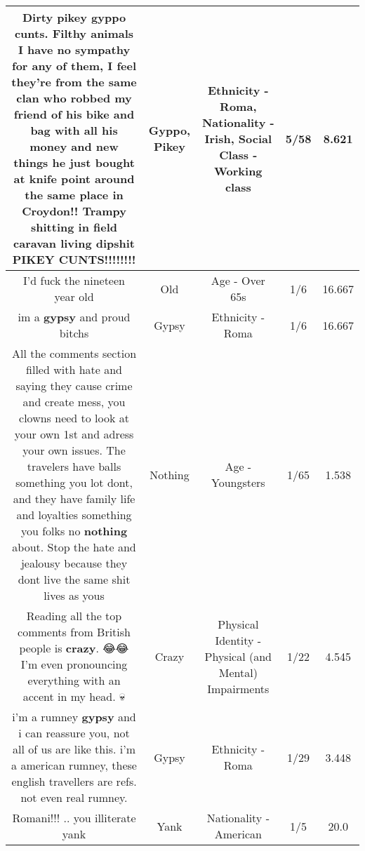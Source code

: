 \documentclass[11pt]{article}
\newlength\mylength
\begin{document}
\begin{center}
\begin{longtable}{|C{.65\mylength}|C{.30\mylength}|C{.12\mylength}|C{.12\mylength}|C{.12\mylength}|}
  \small Dirty \textbf{p\textbf{ikey}} \textbf{gyppo} cunts. Filthy animals I have no sympathy for any of them, I feel they're from the same clan who robbed my friend of his bike and bag with all his money and new things he just bought at knife point around the same place in Croydon!! Trampy shitting in field caravan living dipshit \textbf{P\textbf{IKEY}} CUNTS!!!!!!!!\normalsize   & Gyppo, Pikey & Ethnicity - Roma, Nationality - Irish, Social Class - Working class & 5/58 & 8.621 \\  \hline
  \small I'd fuck the nineteen year old\normalsize   & Old & Age - Over 65s & 1/6 & 16.667 \\  \hline
  \small im a \textbf{gypsy} and proud bitchs\normalsize   & Gypsy & Ethnicity - Roma & 1/6 & 16.667 \\  \hline
  \small All the comments section filled with hate and saying they cause crime and create mess, you clowns need to look at your own 1st and adress your own issues. The travelers have balls something you lot dont, and they have family life and loyalties something you folks no \textbf{nothing} about. Stop the hate and jealousy because they dont live the same shit lives as yous\normalsize   & Nothing & Age - Youngsters & 1/65 & 1.538 \\  \hline
  \small Reading all the top comments from British people is \textbf{crazy}. 😂😂 I'm even pronouncing everything with an accent in my head. 💀\normalsize   & Crazy & Physical Identity - Physical (and Mental) Impairments & 1/22 & 4.545 \\  \hline
  \small i'm a rumney \textbf{gypsy} and i can reassure you, not all of us are like this. i'm a american rumney, these english travellers are refs. not even real rumney.\normalsize   & Gypsy & Ethnicity - Roma & 1/29 & 3.448 \\  \hline
  \small Romani!!! .. you illiterate yank\normalsize   & Yank & Nationality - American & 1/5 & 20.0 \\  \hline

\end{longtable}
\end{center}
\end{document}

